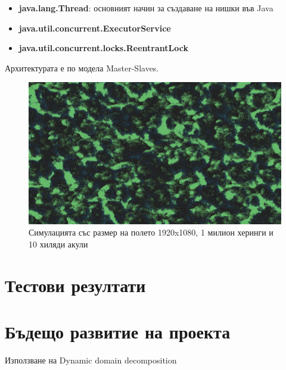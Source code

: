 \documentclass{article}
\begin{document}
\begin{itemize}
 \item \textbf{java.lang.Thread}: основният начин за създаване на нишки във Java
 \item \textbf{java.util.concurrent.ExecutorService}
 \item \textbf{java.util.concurrent.locks.ReentrantLock}
\end{itemize}

Архитектурата е по модела Master-Slaves.

\begin{figure}
	\includegraphics[scale=0.18]{screenshot-big.png}
	\caption{Симулацията със размер на полето 1920x1080, 1 милион херинги и 10 хиляди акули}
\end{figure}

\section{Тестови резултати}


\section{Бъдещо развитие на проекта}
Използване на Dynamic domain decomposition

{}

\end{document}
